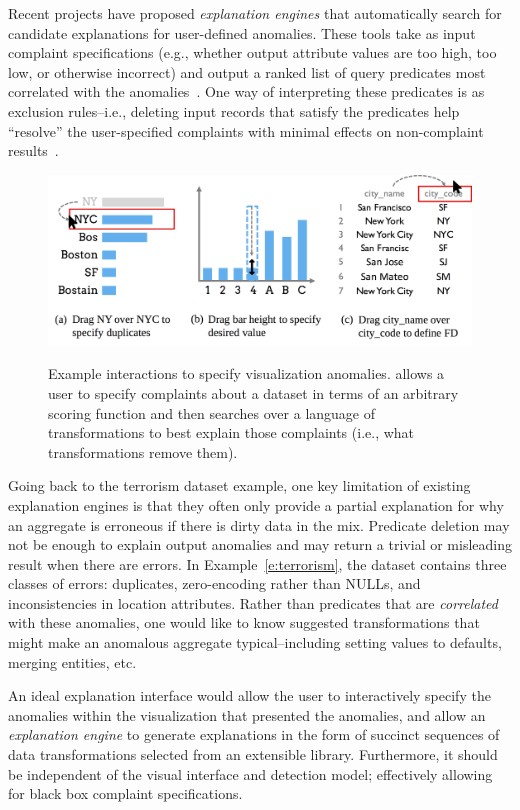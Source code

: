 Recent projects have proposed \emph{explanation engines} that automatically search for candidate explanations for user-defined anomalies.  These tools take as input complaint specifications (e.g., whether output attribute values are too high, too low, or otherwise incorrect) and output a ranked list of query predicates most correlated with the anomalies~\cite{scorpion,DBLP:conf/sigmod/ChalamallaIOP14,bailis2016macrobase,roy2015explaining}.  One way of interpreting these predicates is as exclusion rules--i.e., deleting input records that satisfy the predicates help ``resolve'' the user-specified complaints with minimal effects on non-complaint results~\cite{scorpion}.  

\begin{figure}[tb]
\centering
\includegraphics[width=\columnwidth]{figures/ui.png}
\label{f:ui}
\caption{Example interactions to specify visualization anomalies. \sys allows a user to specify complaints about a dataset in terms of an arbitrary scoring function and then searches over a language of transformations to best explain those complaints (i.e., what transformations remove them).}
\end{figure}

Going back to the terrorism dataset example, one key limitation of existing explanation engines is that they often only provide a partial explanation for why an aggregate is erroneous if there is dirty data in the mix. Predicate deletion may not be enough to explain output anomalies and may return a trivial or misleading result when there are errors. In Example~\ref{e:terrorism}, the dataset contains three classes of errors:  duplicates, zero-encoding rather than NULLs, and inconsistencies in location attributes. Rather than predicates that are \emph{correlated} with these anomalies, one would like to know suggested transformations that might make an anomalous aggregate typical--including setting values to defaults, merging entities, etc. 

An ideal explanation interface would allow the user to interactively specify the anomalies within the visualization that presented the anomalies, and allow an {\it explanation engine} to generate explanations in the form of succinct sequences of data transformations selected from an extensible library. Furthermore, it should be independent of the visual interface and detection model; effectively allowing for black box complaint specifications.

